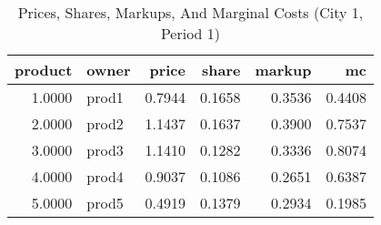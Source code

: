 \begin{table}[htbp]
    \centering
    \caption{Prices, Shares, Markups, And Marginal Costs (City 1, Period 1)}
    \label{tab:q10_results_city1_period1_single_market}
\toprule
\begin{tabular}{rlrrrr}
\toprule
product & owner & price & share & markup & mc \\
\midrule
\midrule
1.0000 & prod1 & 0.7944 & 0.1658 & 0.3536 & 0.4408 \\
2.0000 & prod2 & 1.1437 & 0.1637 & 0.3900 & 0.7537 \\
3.0000 & prod3 & 1.1410 & 0.1282 & 0.3336 & 0.8074 \\
4.0000 & prod4 & 0.9037 & 0.1086 & 0.2651 & 0.6387 \\
5.0000 & prod5 & 0.4919 & 0.1379 & 0.2934 & 0.1985 \\
\bottomrule
\bottomrule
\end{tabular}

\end{table}
